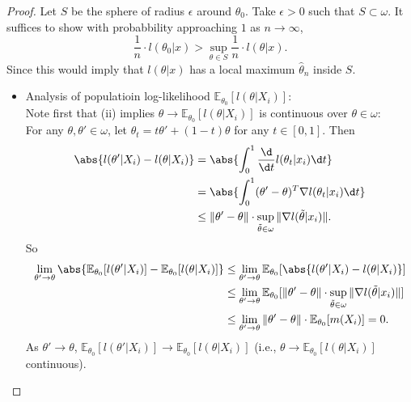 \documentclass[a4paper]{article}
\begin{document}
\begin{proof}
	Let $S$ be the sphere of radius $\epsilon$ around $\theta_0$. Take $\epsilon > 0$ such that $S \subset \omega$. It suffices to show with probabbility approaching $1$ as $n \to \infty$,
	\begin{equation}
		\frac{1}{n} \cdot l(\theta_0|x) > \sup\limits_{\theta \in S} \frac{1}{n} \cdot l(\theta|x).
	\end{equation}
	Since this would imply that $l(\theta|x)$ has a local maximum $\hat{\theta}_n$ inside $S$.
	\begin{itemize}[leftmargin=*]
		\item Analysis of populatioin log-likelihood $\mathbb{E}_{\theta_0}[l(\theta|X_i)]$:\\
		Note first that (ii) implies $\theta \to \mathbb{E}_{\theta_0}[l(\theta|X_i)]$ is continuous over $\theta \in \omega$:\\
		For any $\theta,\theta' \in \omega$, let $\theta_t = t\theta'+(1-t)\theta$ for any $t \in [0,1]$. Then
		\begin{equation*}
			\begin{aligned}
				\abs{l(\theta'|X_i)-l(\theta|X_i)} &= \abs{\int_0^1 \frac{\d}{\d t}l(\theta_t|x_i) \d t} \\
				&= \abs{\int_0^1 (\theta' - \theta)^T \nabla l(\theta_t|x_i) \d t} \\
				&\leq \Vert \theta' - \theta \Vert \cdot \sup\limits_{\tilde{\theta} \in \omega} \Vert \nabla l(\tilde{\theta}|x_i) \Vert.
			\end{aligned}
		\end{equation*}
		So
		\begin{equation*}
			\begin{aligned}
				\lim\limits_{\theta' \to \theta} \abs{\mathbb{E}_{\theta_0}[l(\theta'|X_i)] - \mathbb{E}_{\theta_0}[l(\theta|X_i)]} &\leq \lim\limits_{\theta' \to \theta} \mathbb{E}_{\theta_0}[\abs{l(\theta'|X_i)-l(\theta|X_i)}] \\
				&\leq \lim\limits_{\theta' \to \theta} \mathbb{E}_{\theta_0} [\Vert \theta' - \theta \Vert \cdot \sup\limits_{\tilde{\theta} \in \omega} \Vert \nabla l(\tilde{\theta}|x_i) \Vert] \\
				&\leq \lim\limits_{\theta' \to \theta} \Vert \theta' - \theta \Vert \cdot \mathbb{E}_{\theta_0} [m(X_i)] = 0.
			\end{aligned}
		\end{equation*}
		As $\theta' \to \theta$, $\mathbb{E}_{\theta_0}[l(\theta'|X_i)] \to \mathbb{E}_{\theta_0}[l(\theta|X_i)]$ (i.e., $\theta \to \mathbb{E}_{\theta_0}[l(\theta|X_i)]$ continuous).

\end{itemize}
\end{proof}
\end{document}
